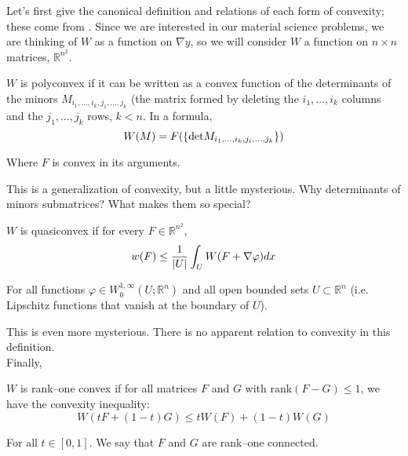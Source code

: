 \documentclass[../main.tex]{subfiles}
\begin{document}
Let's first give the canonical definition and relations of each form of convexity; these come from \cite{dacorogna_direct_2008}.
Since we are interested in our material science problems, we are thinking of $W$ as a function on $\nabla y$, so we will consider $W$ a function on $n \times n$ matrices, $\mathbb{R}^{n^2}$.


\begin{defn}[Polyconvexity]
	$W$ is polyconvex if it can be written as a convex function of the determinants of the minors $M_{i_1, \ldots, i_k, j_1, \ldots, j_k}$ (the matrix formed by deleting the $i_1, \ldots, i_k$ columns and the $j_1, \ldots, j_k$ rows, $k < n$.
	In a formula,
	\begin{equation*}
		W(M) = F( \{\mathrm{det} M_{i_1, \ldots, i_k, j_i, \ldots, j_k}\} )
	\end{equation*}

	Where $F$ is convex in its arguments.
\end{defn}

This is a generalization of convexity, but a little mysterious.
Why determinants of minors submatrices?
What makes them so special?

\begin{defn}[Quasiconvexity]
	$W$ is quasiconvex if for every $F \in \mathbb{R}^{n^2}$,
	\begin{equation*}
		w(F) \leq \frac{1}{\lvert U\rvert} \int_U W(F + \nabla \varphi) dx
	\end{equation*}

	For all functions $\varphi \in W^{1,\infty}_0(U; \mathbb{R}^n)$ and all open bounded sets $U \subset \mathbb{R}^n$ (i.e. Lipschitz functions that vanish at the boundary of $U$).
\end{defn}

This is even more mysterious.
There is no apparent relation to convexity in this definition. \\

Finally,

\begin{defn}
	$W$ is rank--one convex if for all matrices $F$ and $G$ with $\mathrm{rank}(F-G) \leq 1$, we have the convexity inequality:
	\begin{equation*}
		W(t F + (1-t) G) \leq t W(F) + (1-t) W(G)
	\end{equation*}

	For all $t \in [0,1]$. We say that $F$ and $G$ are rank--one connected.
\end{defn}
\end{document}
